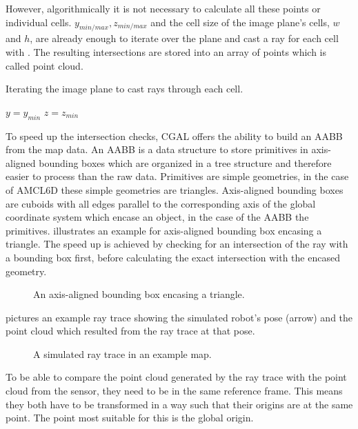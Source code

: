\documentclass[Thesis.tex]{subfiles}
\begin{document}
However, algorithmically it is not necessary to calculate all these points or individual cells. $y_{min/max}, z_{min/max}$ and the cell size of the image plane's cells, $w$ and $h$, are already enough to iterate over the plane and cast a ray for each cell with . The resulting intersections are stored into an array of points which is called point cloud.
%
\begin{algorithm}[!htp]
\caption{Iterating the image plane to cast rays through each cell.}
\label{alg:iterate_imageplane}
$y = y_{min}$\;
$z = z_{min}$\;
\end{algorithm}
%
To speed up the intersection checks, \gls{CGAL} offers the ability to build an \gls{AABB}\label{page:aabb} from the map data\cite[]{cgal:atw-aabb-14b}. An \gls{AABB} is a data structure to store primitives in axis-aligned bounding boxes which are organized in a tree structure and therefore easier to process than the raw data. Primitives are simple geometries, in the case of \gls{AMCL6D} these simple geometries are triangles. Axis-aligned bounding boxes are cuboids with all edges parallel to the corresponding axis of the global coordinate system which encase an object, in the case of the \gls{AABB} the primitives.  illustrates an example for axis-aligned bounding box encasing a triangle. 
The speed up is achieved by checking for an intersection of the ray with a bounding box first, before calculating the exact intersection with the encased geometry.
\begin{figure}%
  \caption{An axis-aligned bounding box encasing a triangle.}%
  \label{fig:aabb_ex}%
\end{figure}
%
 pictures an example ray trace showing the simulated robot's pose (arrow) and the point cloud which resulted from the ray trace at that pose.
\begin{figure}[!htp]
  \caption{A simulated ray trace in an example map.}
  \label{fig:raytrace}
\end{figure}
%
To be able to compare the point cloud generated by the ray trace with the point cloud from the sensor, they need to be in the same reference frame. This means they both have to be transformed in a way such that their origins are at the same point. The point most suitable for this is the global origin. 
\end{document}
